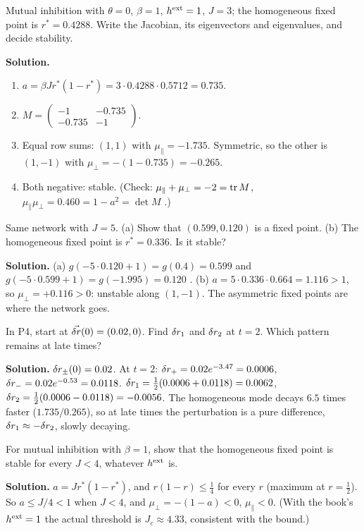 \begin{example}
Mutual inhibition with $\theta=0$, $\beta=1$, $h^{\text{ext}}=1$, $J=3$; the homogeneous fixed point is $r^*=0.4288$. Write the Jacobian, its eigenvectors and eigenvalues, and decide stability.

\textbf{Solution.}
\begin{enumerate}
  \item $a=\beta Jr^*(1-r^*)=3\cdot0.4288\cdot0.5712=0.735$.
  \item $M=\begin{pmatrix}-1&-0.735\\-0.735&-1\end{pmatrix}$.
  \item Equal row sums: $(1,1)$ with $\mu_\parallel=-1.735$. Symmetric, so the other is $(1,-1)$ with $\mu_\perp=-(1-0.735)=-0.265$.
  \item Both negative: stable. (Check: $\mu_\parallel+\mu_\perp=-2=\operatorname{tr} M$, $\mu_\parallel\mu_\perp=0.460=1-a^2=\det M$ \checkmark.)
\end{enumerate}
\end{example}

\begin{example}
Same network with $J=5$. (a) Show that $(0.599,0.120)$ is a fixed point. (b) The homogeneous fixed point is $r^*=0.336$. Is it stable?

\textbf{Solution.} (a) $g(-5\cdot0.120+1)=g(0.4)=0.599$ and $g(-5\cdot0.599+1)=g(-1.995)=0.120$ \checkmark.
(b) $a=5\cdot0.336\cdot0.664=1.116>1$, so $\mu_\perp=+0.116>0$: unstable along $(1,-1)$. The asymmetric fixed points are where the network goes.
\end{example}

\begin{example}
In P4, start at $\vec{\delta r}(0)=(0.02,0)$. Find $\delta r_1$ and $\delta r_2$ at $t=2$. Which pattern remains at late times?

\textbf{Solution.} $\delta r_\pm(0)=0.02$. At $t=2$: $\delta r_+=0.02e^{-3.47}=0.0006$, $\delta r_-=0.02e^{-0.53}=0.0118$.
$\delta r_1=\tfrac12(0.0006+0.0118)=0.0062$, $\delta r_2=\tfrac12(0.0006-0.0118)=-0.0056$.
The homogeneous mode decays $6.5$ times faster ($1.735/0.265$), so at late times the perturbation is a pure difference, $\delta r_1\approx-\delta r_2$, slowly decaying.
\end{example}

\begin{example}[P7: Never unstable below $J=4$]
For mutual inhibition with $\beta=1$, show that the homogeneous fixed point is stable for every $J<4$, whatever $h^{\text{ext}}$ is.

\textbf{Solution.} $a=Jr^*(1-r^*)$, and $r(1-r)\le\tfrac14$ for every $r$ (maximum at $r=\tfrac12$). So $a\le J/4<1$ when $J<4$, and $\mu_\perp=-(1-a)<0$, $\mu_\parallel<0$. (With the book's $h^{\text{ext}}=1$ the actual threshold is $J_c\approx4.33$, consistent with the bound.)
\end{example}

